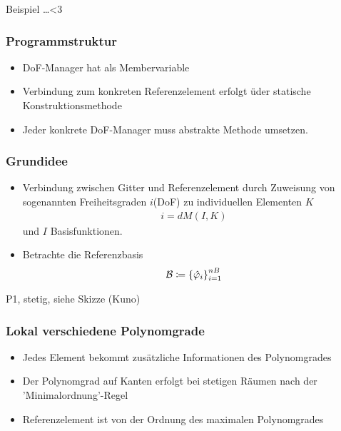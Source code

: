 Beispiel \dots <3
\subsubsection{Programmstruktur}
\begin{itemize}
\item DoF-Manager hat  als Membervariable
\item Verbindung zum konkreten Referenzelement erfolgt üder statische Konstruktionsmethode 
\item Jeder konkrete DoF-Manager muss abstrakte Methode  umsetzen. 
\end{itemize}
\subsubsection{Grundidee}
\begin{itemize}
\item Verbindung zwischen Gitter und Referenzelement durch Zuweisung von sogenannten Freiheitsgraden $i$(DoF) zu individuellen Elementen $K$
  \begin{align*}
    i = dM(I, K)
  \end{align*}
und $I$ Basisfunktionen. 
\item Betrachte die Referenzbasis
\begin{align*}
  {\cal B} \coloneqq \left\{ \hat {\varphi}_i \right\}_{i = 1}^{nB}
\end{align*}
\end{itemize}
\begin{beispiel*}
  P1, stetig, siehe Skizze (Kuno)
\end{beispiel*}
\subsubsection{Lokal verschiedene Polynomgrade}
\begin{itemize}
\item Jedes Element bekommt zusätzliche Informationen des Polynomgrades
\item Der Polynomgrad auf Kanten erfolgt bei stetigen Räumen nach der 'Minimalordnung'-Regel 
\item Referenzelement ist von der Ordnung des maximalen Polynomgrades
\end{itemize}